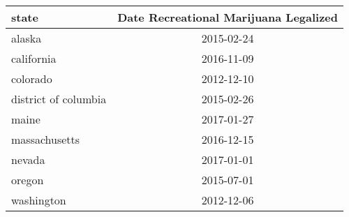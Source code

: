 \begin{tabular}{lc}
  \hline
state & Date Recreational Marijuana Legalized \\ 
  \hline
alaska & 2015-02-24 \\ 
  california & 2016-11-09 \\ 
  colorado & 2012-12-10 \\ 
  district of columbia & 2015-02-26 \\ 
  maine & 2017-01-27 \\ 
  massachusetts & 2016-12-15 \\ 
  nevada & 2017-01-01 \\ 
  oregon & 2015-07-01 \\ 
  washington & 2012-12-06 \\ 
   \hline
\end{tabular}
